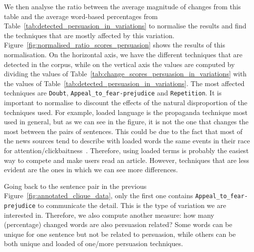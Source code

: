 We then analyse the ratio between the average magnitude of changes from this table and the average word-based percentages from Table~\ref{tab:detected_persuasion_in_variations} to normalise the results and find the techniques that are mostly affected by this variation.
Figure~\ref{fig:normalised_ratio_scores_persuasion} shows the results of this normalisation.
On the horizontal axis, we have the different techniques that are detected in the corpus, while on the vertical axis the values are computed by dividing the values of Table~\ref{tab:change_scores_persuasion_in_variations} with the values of Table~\ref{tab:detected_persuasion_in_variations}.
The most affected techniques are \texttt{Doubt}, \texttt{Appeal\_to\_fear-prejudice} and \texttt{Repetition}.
It is important to normalise to discount the effects of the natural disproportion of the techniques used.
For example, loaded language is the propaganda technique most used in general, but as we can see in the figure, it is not the one that changes the most between the pairs of sentences. This could be due to the fact that
most of the news sources tend to describe with loaded words the same events in their race for attention/clickbaitness~\citep{bazaco2019clickbait,davenport2001attention}.
Therefore, using loaded terms is probably the easiest way to compete and make users read an article. However, techniques that are less evident are the ones in which we can see more differences.


Going back to the sentence pair in the previous Figure~\ref{fig:annotated_clique_data}, only the first one contains \texttt{Appeal\_to\_fear-prejudice} to communicate the detail. This is the type of variation we are interested in.
%
Therefore, we also compute another measure: how many (percentage) changed words are also persuasion related? Some words can be unique for one sentence but not be related to persuasion, while others can be both unique and loaded of one/more persuasion techniques.


